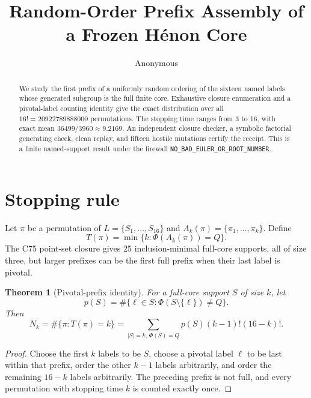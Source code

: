 \documentclass[10pt]{article}
\title{Random-Order Prefix Assembly of a Frozen H\'enon Core}
\author{Anonymous}
\date{}
\newtheorem{theorem}{Theorem}
\begin{document}
\maketitle

\begin{abstract}
We study the first prefix of a uniformly random ordering of the sixteen named
labels whose generated subgroup is the full finite core.  Exhaustive closure
enumeration and a pivotal-label counting identity give the exact distribution
over all $16!=20922789888000$ permutations.  The stopping time ranges from 3
to 16, with exact mean $36499/3960\approx9.2169$.  An independent closure
checker, a symbolic factorial generating check, clean replay, and fifteen
hostile mutations certify the receipt.  This is a finite named-support result
under the firewall \texttt{NO\_BAD\_EULER\_OR\_ROOT\_NUMBER}.
\end{abstract}

\section{Stopping rule}
Let $\pi$ be a permutation of $L=\{S_1,\ldots,S_{16}\}$ and
$A_k(\pi)=\{\pi_1,\ldots,\pi_k\}$.  Define
\[
 T(\pi)=\min\{k:\Phi(A_k(\pi))=Q\}.
\]
The C75 point-set closure gives 25 inclusion-minimal full-core supports, all
of size three, but larger prefixes can be the first full prefix when their
last label is pivotal.

\begin{theorem}[Pivotal-prefix identity]
For a full-core support $S$ of size $k$, let
\[
 p(S)=\#\{\ell\in S:\Phi(S\setminus\{\ell\})\ne Q\}.
\]
Then
\[
 N_k=\#\{\pi:T(\pi)=k\}
 =\sum_{|S|=k,\,\Phi(S)=Q}p(S)(k-1)!(16-k)!.
\]
\end{theorem}
\begin{proof}
Choose the first $k$ labels to be $S$, choose a pivotal label $\ell$ to be
last within that prefix, order the other $k-1$ labels arbitrarily, and order
the remaining $16-k$ labels arbitrarily.  The preceding prefix is not full,
and every permutation with stopping time $k$ is counted exactly once.
\end{proof}
\end{document}
